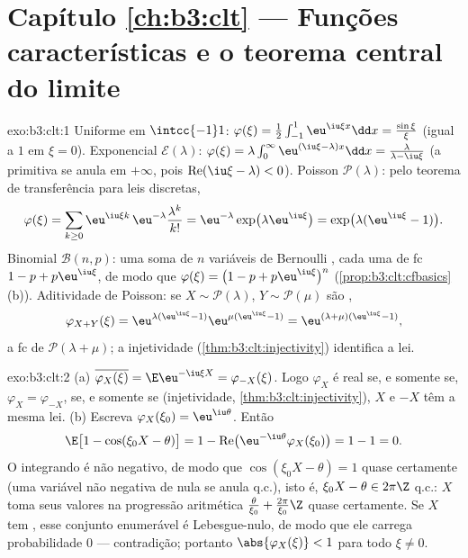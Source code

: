 \section*{Capítulo \ref{ch:b3:clt} --- Funções características
e o teorema central do limite}

\begin{solution}{exo:b3:clt:1}
Uniforme em $\intcc{-1}1$: $\varphi(\xi) =
\frac12\int_{-1}^1\eu^{\iu\xi x}\dd x =
\frac{\sin\xi}{\xi}$ (igual a $1$ em $\xi = 0$).
Exponencial $\mathcal E(\lambda)$: $\varphi(\xi) =
\lambda\int_0^\infty\eu^{(\iu\xi - \lambda)x}\dd x =
\frac{\lambda}{\lambda - \iu\xi}$ (a primitiva
se anula em $+\infty$, pois $\operatorname{Re}(\iu\xi -
\lambda) < 0$). Poisson $\mathcal P(\lambda)$: pelo
teorema de transferência para leis discretas,
\[
\varphi(\xi) = \sum_{k\geq0}\eu^{\iu\xi
k}\,\eu^{-\lambda}\frac{\lambda^k}{k!}
= \eu^{-\lambda}\exp\bigl(\lambda\eu^{\iu\xi}\bigr)
= \exp\bigl(\lambda(\eu^{\iu\xi} - 1)\bigr).
\]
Binomial $\mathcal B(n, p)$: uma soma de $n$ variáveis de Bernoulli
, cada uma de fc $1 - p + p\eu^{\iu\xi}$,
de modo que $\varphi(\xi) = \bigl(1 - p + p\eu^{\iu\xi}\bigr)^n$
(\cref{prop:b3:clt:cfbasics}(b)). Aditividade de Poisson: se $X
\sim \mathcal P(\lambda)$, $Y \sim \mathcal P(\mu)$ são
,
\[
\varphi_{X+Y}(\xi) = \eu^{\lambda(\eu^{\iu\xi}-1)}
\eu^{\mu(\eu^{\iu\xi}-1)} =
\eu^{(\lambda+\mu)(\eu^{\iu\xi}-1)},
\]
a fc de $\mathcal P(\lambda + \mu)$; a injetividade
(\cref{thm:b3:clt:injectivity}) identifica a lei.
\end{solution}

\begin{solution}{exo:b3:clt:2}
(a) $\overline{\varphi_X(\xi)} = \E\eu^{-\iu\xi X} =
\varphi_{-X}(\xi)$. Logo $\varphi_X$ é real se, e somente se,
$\varphi_X = \varphi_{-X}$, se, e somente se (injetividade,
\cref{thm:b3:clt:injectivity}), $X$ e $-X$ têm a mesma
lei.
(b) Escreva $\varphi_X(\xi_0) = \eu^{\iu\theta}$. Então
\[
\E\bigl[1 - \cos(\xi_0X - \theta)\bigr]
= 1 - \operatorname{Re}\bigl(\eu^{-\iu\theta}
\varphi_X(\xi_0)\bigr) = 1 - 1 = 0 .
\]
O integrando é não negativo, de modo que $\cos(\xi_0X - \theta) = 1$
quase certamente (uma variável não negativa de  nula
se anula q.c.), isto é, $\xi_0X - \theta \in 2\pi\Z$ q.c.: $X$
toma seus valores na progressão aritmética
$\frac{\theta}{\xi_0} + \frac{2\pi}{\xi_0}\Z$ quase certamente.
Se $X$ tem , esse conjunto enumerável é Lebesgue-nulo,
de modo que ele carrega probabilidade $0$ --- contradição; portanto
$\abs{\varphi_X(\xi)} < 1$ para todo $\xi \neq 0$.
\end{solution}

